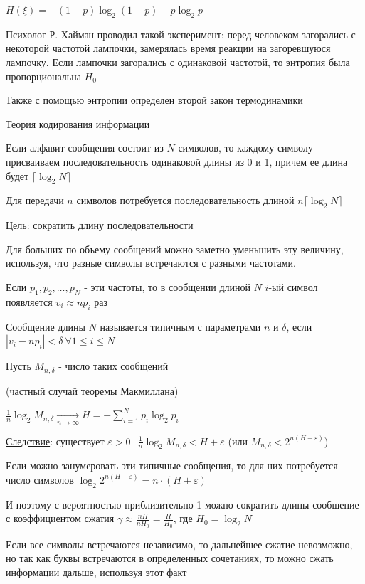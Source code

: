 \documentclass[12pt]{article}
\begin{document}
$H(\xi) = -(1 - p) \log_2 (1 - p) - p \log_2 p$


 Психолог Р. Хайман проводил такой эксперимент: перед человеком загорались с некоторой частотой лампочки, замерялась время реакции на загоревшуюся лампочку. 
Если лампочки загорались с одинаковой частотой, то энтропия была пропорциональна $H_0$

 Также с помощью энтропии определен второй закон термодинамики

 Теория кодирования информации

Если алфавит сообщения состоит из $N$ символов, то каждому символу присваиваем последовательность одинаковой длины из 0 и 1, 
причем ее длина будет $\lceil\log_2 N\rceil$

Для передачи $n$ символов потребуется последовательность длиной $n\lceil\log_2 N\rceil$

Цель: сократить длину последовательности

Для больших по объему сообщений можно заметно уменьшить эту величину, используя, что разные символы встречаются с разными частотами.

Если $p_1, p_2, \dots, p_N$ - эти частоты, то в сообщении длиной $N$ $i$-ый символ появляется $v_i \approx n p_i$ раз 

\Def Сообщение длины $N$ называется типичным с параметрами $n$ и $\delta$, если $|v_i - n p_i| < \delta \ \forall 1 \leq i \leq N$

Пусть $M_{n, \delta}$ - число таких сообщений

\begin{MyTheorem}
    \Ths (частный случай теоремы Макмиллана)

    $\frac{1}{n} \log_2 M_{n, \delta} \underset{n \to \infty}{\longrightarrow} H = -\sum_{i = 1}^N p_i \log_2 p_i$
\end{MyTheorem}

\underline{Следствие}: существует $\varepsilon > 0 \ | \ \frac{1}{n} \log_2 M_{n,\delta} < H + \varepsilon$ (или $M_{n, \delta} < 2^{n(H + \varepsilon)}$)

Если можно занумеровать эти типичные сообщения, то для них потребуется число символов $\log_2 2^{n(H + \varepsilon)} = n \cdot (H + \varepsilon)$

И поэтому с вероятностью приблизительно 1 можно сократить длины сообщение с коэффициентом сжатия $\gamma \approx \frac{nH}{nH_0} = \frac{H}{H_0}$, где $H_0 = \log_2 N$

Если все символы встречаются независимо, то дальнейшее сжатие невозможно, но так как буквы встречаются в определенных сочетаниях, то можно сжать 
информации дальше, используя этот факт
\end{document}
